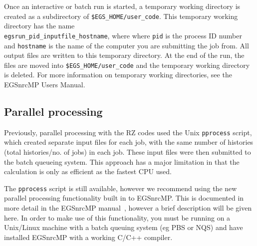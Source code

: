 \documentclass[12pt,twoside]{article}  %
\begin{document}
Once an interactive or batch run is started, a temporary working 
directory is created as
a subdirectory of {\tt \$EGS\_HOME/user\_code}.  This temporary working directory
has the name\\
{\tt egsrun\_pid\_inputfile\_hostname}, where where {\tt pid} is the process ID
number and {\tt hostname} is the name of the
computer you are submitting the job from.  All output files are written
to this temporary directory.  At the end of the run, the files are moved into
{\tt \$EGS\_HOME/user\_code} and the temporary working directory is
deleted.  For more information on temporary working directories, see the
EGSnrcMP Users Manual\cite{Ka03}.

\subsection{Parallel processing}
\label{parallelsect}

Previously, parallel processing with the RZ codes used the 
Unix {\tt pprocess} script, which created  
separate input files for
each job, with the same number of histories
(total histories/no. of jobs) in each job.  These input files were
then submitted to the batch queueing system.  This approach has a
major limitation in that the calculation is only as efficient as the
fastest CPU used.

The {\tt pprocess} script is still available, however we recommend
using the new parallel processing functionality built in to
EGSnrcMP. This is documented in more detail in the
EGSnrcMP manual~\cite{Ka03}, however a brief description will be
given here.  In order to make use of this functionality, you must
be running on a Unix/Linux machine with a batch queuing system
(eg PBS or NQS) and have installed EGSnrcMP with a
working C/C++ compiler.
\end{document}
